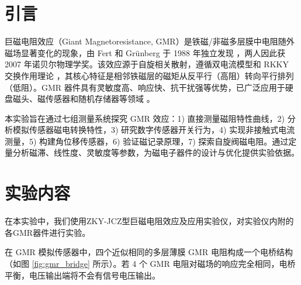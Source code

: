 \documentclass{thuemp}
\begin{document}
\section{引言}
\enlargethispage{-3.3cm}
巨磁电阻效应（Giant Magnetoresistance, GMR）是铁磁/非磁多层膜中电阻随外磁场显著变化的现象，由 Fert 和 Grünberg 于 1988 年独立发现 \cite{BAIBICH19882472,BINASCH19894828}，两人因此获 2007 年诺贝尔物理学奖。该效应源于自旋相关散射，遵循双电流模型和 RKKY 交换作用理论 \cite{PARKIN19902304}，其核心特征是相邻铁磁层的磁矩从反平行（高阻）转向平行排列（低阻）。GMR 器件具有灵敏度高、响应快、抗干扰强等优势，已广泛应用于硬盘磁头、磁传感器和随机存储器等领域 \cite{王合英2008磁控溅射镀膜过程中非均匀磁场中电子的运动}。

本实验旨在通过七组测量系统探究 GMR 效应：1) 直接测量磁阻特性曲线，2) 分析模拟传感器磁电转换特性，3) 研究数字传感器开关行为，4) 实现非接触式电流测量，5) 构建角位移传感器，6) 验证磁记录原理，7) 探索自旋阀磁电阻。通过定量分析磁滞、线性度、灵敏度等参数，为磁电子器件的设计与优化提供实验依据。

\section{实验内容}

在本实验中，我们使用ZKY-JCZ型巨磁电阻效应及应用实验仪，对实验仪内附的各GMR器件进行实验。

在 GMR 模拟传感器中，四个近似相同的多层薄膜 GMR 电阻构成一个电桥结构（如图 \ref{fig:gmr_bridge} 所示）。若 4 个 GMR 电阻对磁场的响应完全相同，电桥平衡，电压输出端将不会有信号电压输出。
\end{document}
